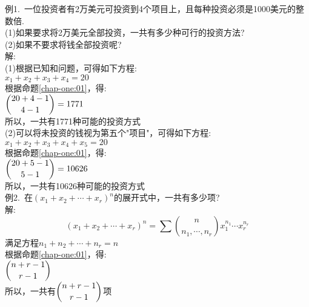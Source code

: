 例1.\ 一位投资者有2万美元可投资到4个项目上，且每种投资必须是1000美元的整数倍.\\
(1)如果要求将2万美元全部投资，一共有多少种可行的投资方法?\\
(2)如果不要求将钱全部投资呢?\\
解:\\
(1)根据已知和问题，可得如下方程:\\
$x_1+x_2+x_3+x_4=20$\\
根据命题\ref{chap-one:01}，得:\\[1ex]
$\dbinom{20+4-1}{4-1}=1771$\\
所以，一共有1771种可能的投资方式\\
(2)可以将未投资的钱视为第五个"项目"，可得如下方程:\\
$x_1+x_2+x_3+x_4+x_5=20$\\
根据命题\ref{chap-one:01}，得:\\[1ex]
$\dbinom{20+5-1}{5-1}=10626$\\
所以，一共有10626种可能的投资方式\\[1ex]

例2.\ 在$(x_1+x_2+\cdots+x_r)^n$的展开式中，一共有多少项?\\
解:
\[(x_1+x_2+\cdots+x_r)^n=\sum\binom{n}{n_1,\cdots,n_r}x_1^{n_1}\cdots x_r^{n_r}\]
满足方程$n_1+n_2+\cdots+n_r=n$\\
根据命题\ref{chap-one:01}，得:\\[1ex]
$\dbinom{n+r-1}{r-1}$\\
所以，一共有$\dbinom{n+r-1}{r-1}$项\\[2ex]



